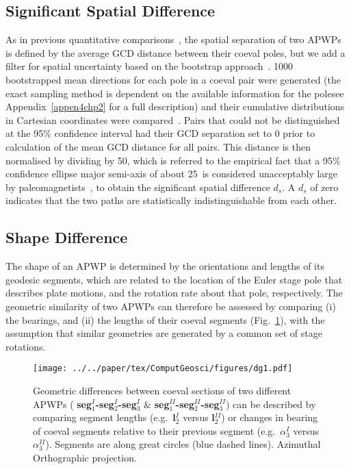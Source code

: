 \subsection{Significant Spatial Difference}\label{sec:sigDs}

As in previous quantitative comparisons~\citep[for example]{S07,T08}, the spatial
separation of two APWPs is defined by the average GCD distance between their
coeval poles, but we add a filter for spatial uncertainty based on the bootstrap
approach~\citep{T91}. 1000 bootstrapped mean directions for each pole in a
coeval pair were generated (the exact sampling method is dependent on the
available information for the pole\textemdash{}see Appendix~\ref{appen4chp2} for
a full description) and their cumulative distributions in Cartesian coordinates
were compared~\citep{T91}. Pairs that could not be distinguished at the
95\% confidence interval had their GCD separation set to 0 prior to calculation
of the mean GCD distance for all pairs. This distance is then normalised by
dividing by 50\degree, which is referred to the empirical fact that a 95\%
confidence ellipse major semi-axis of about 25\degree\ is considered unacceptably
large by paleomagnetists~\citep{B92}, to obtain the significant spatial
difference $d_s$. A $d_s$ of zero indicates that the two paths are statistically
indistinguishable from each other.

\subsection{Shape Difference}

The shape of an APWP is determined by the orientations and lengths of its
geodesic segments, which are related to the location of the Euler stage pole
that describes plate motions, and the rotation rate about that pole,
respectively. The geometric similarity of two APWPs can therefore be assessed
by comparing (i) the bearings, and (ii) the lengths of their coeval segments
(Fig.~\ref{fig:direcdiff}), with the assumption that similar geometries are
generated by a common set of stage rotations.

\begin{figure}[!ht]
\texttt{[image: ../../paper/tex/ComputGeosci/figures/dg1.pdf]}
\caption[Geometric difference definition between two APWPs]{Geometric
differences between coeval sections of two different APWPs ({\bf
seg$_1^I$-seg$_2^I$-seg$_3^I$} \& {\bf seg$_1^{II}$-seg$_2^{II}$-seg$_3^{II}$})
can be described by comparing segment lengths (e.g.\ {\bf l$_2^I$} versus {\bf
l$_2^{II}$}) or changes in bearing of coeval segments relative to their
previous segment (e.g.\ {\bf $\alpha_3^I$} versus {\bf $\alpha_3^{II}$}). Segments
are along great circles (blue dashed lines). Azimuthal Orthographic
projection.}\label{fig:direcdiff}
\end{figure}

